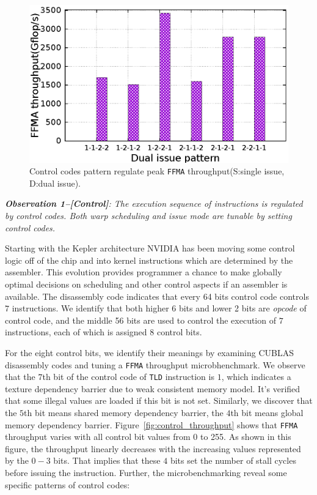 \documentclass{sig-alternate-05-2015}
\begin{document}
\begin{figure}[htbp]
\begin{center}
\includegraphics[scale=0.5]{pattern}
    \caption{Control codes pattern regulate peak {\tt FFMA} throughput(S:single issue, D:dual issue).}
\label{fig:pattern}
\end{center}
\end{figure}

{\em {\bf Observation 1--[Control]}: The execution sequence of instructions is regulated by control codes. Both warp scheduling and issue mode are tunable by setting control codes.}

Starting with the Kepler architecture NVIDIA has been moving some control logic off of the chip and into kernel instructions which are determined by the assembler. This evolution provides programmer a chance to make globally optimal decisions on scheduling and other control aspects if an assembler is available. The disassembly code indicates that every 64 bits control code controls $7$ instructions. We identify that both higher $6$ bits and lower 2 bits are {\em opcode} of control code, and the middle 56 bits are used to control the execution of $7$ instructions, each of which is assigned $8$ control bits.

For the eight control bits, we identify their meanings by examining CUBLAS disassembly codes and tuning a {\tt FFMA}
throughput microbhenchmark. We observe that the $7$th bit of the control code of {\tt TLD} instruction is $1$, which
indicates a texture dependency barrier due to weak consistent memory model. It's verified that some illegal values are
loaded if this bit is not set. Similarly, we discover that the $5$th bit means shared memory dependency barrier, the
$4$th bit means global memory dependency barrier. Figure~\ref{fig:control_throughput} shows that {\tt FFMA} throughput varies with all control bit values from 0 to 255. As shown in this figure, the throughput linearly decreases with the increasing values represented by the $0-3$ bits. That implies that these $4$ bits set the number of stall cycles before issuing the instruction. Further, the microbenchmarking reveal some specific patterns of control codes:
\end{document}
